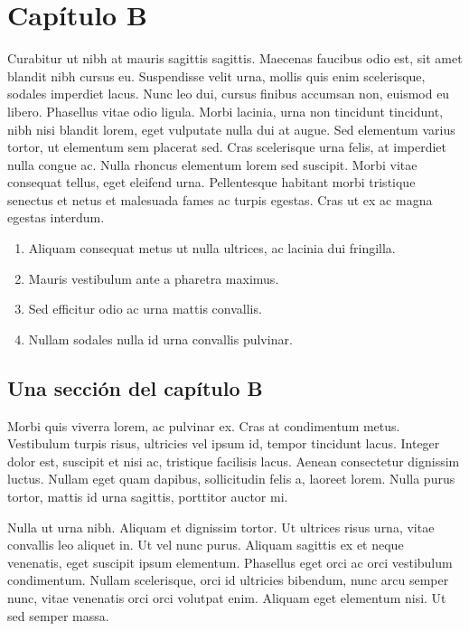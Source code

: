 \chapter{Cap\'itulo B}
\label{chap:B}

Curabitur ut nibh at mauris sagittis sagittis. Maecenas faucibus odio est, sit amet blandit nibh cursus eu. Suspendisse velit urna, mollis quis enim scelerisque, sodales imperdiet lacus. Nunc leo dui, cursus finibus accumsan non, euismod eu libero. Phasellus vitae odio ligula. Morbi lacinia, urna non tincidunt tincidunt, nibh nisi blandit lorem, eget vulputate nulla dui at augue. Sed elementum varius tortor, ut elementum sem placerat sed. Cras scelerisque urna felis, at imperdiet nulla congue ac. Nulla rhoncus elementum lorem sed suscipit. Morbi vitae consequat tellus, eget eleifend urna. Pellentesque habitant morbi tristique senectus et netus et malesuada fames ac turpis egestas. Cras ut ex ac magna egestas interdum.  

\begin{enumerate}
	\item Aliquam consequat metus ut nulla ultrices, ac lacinia dui fringilla.
	\item Mauris vestibulum ante a pharetra maximus.
	\item Sed efficitur odio ac urna mattis convallis.
	\item Nullam sodales nulla id urna convallis pulvinar.
\end{enumerate}

\section{Una secci\'on del cap\'itulo B}

Morbi quis viverra lorem, ac pulvinar ex. Cras at condimentum metus. Vestibulum turpis risus, ultricies vel ipsum id, tempor tincidunt lacus. Integer dolor est, suscipit et nisi ac, tristique facilisis lacus. Aenean consectetur dignissim luctus. Nullam eget quam dapibus, sollicitudin felis a, laoreet lorem. Nulla purus tortor, mattis id urna sagittis, porttitor auctor mi.

Nulla ut urna nibh. Aliquam et dignissim tortor. Ut ultrices risus urna, vitae convallis leo aliquet in. Ut vel nunc purus. Aliquam sagittis ex et neque venenatis, eget suscipit ipsum elementum. Phasellus eget orci ac orci vestibulum condimentum. Nullam scelerisque, orci id ultricies bibendum, nunc arcu semper nunc, vitae venenatis orci orci volutpat enim. Aliquam eget elementum nisi. Ut sed semper massa.
		
